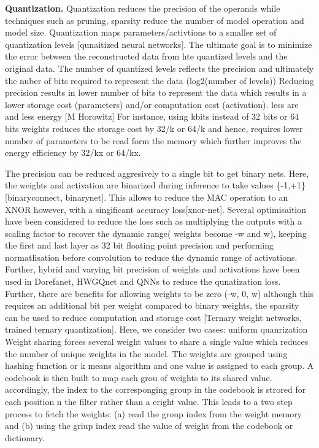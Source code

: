 \noindent\textbf{Quantization.} Quantization reduces the precision of the operands while techniques such as pruning, sparsity reduce the number of model operation and model size.
Quantization maps parameters/activtions to a smaller set of quantization levels [qunaitized neural networks].
The ultimate goal is to minimize the error between the reconstructed data from hte quantized levels and the original data.
The number of quantized levels reflects the precision and ultimately the nuber of bits required to represent the data (log2(number of levels))
Reducing precision results in lower number of bits to represent the data which results in a lower storage cost (parameters) and/or computation cost (activation). less are and less energy [M Horowitz]
For instance, using kbits instead of 32 bits or 64 bits weights reduces the storage cost by 32/k or 64/k and hence, requires lower number of parameters to be read form the memory which further improves the energy efficiency by 32/kx or 64/kx.

The precision can be reduced aggresively to a single bit to get binary nets. Here, the weights  and activation are binarized during inference to take values \{-1,+1\} [binaryconnect, binarynet]. This allows to reduce the MAC operation to an XNOR however, with a singificant accuracy loss[xnor-net].
Several optimisaition have been considered to reduce the loss such as multiplying the outputs with a scaling factor to recover the dynamic range( weights become -w and w), keeping the first and last layer as 32 bit floating point precision and performing normatlisation before convolution to reduce the dynamic range of activations.
Further, hybrid and varying bit precision of weights and activations have been used in Dorefanet, HWGQnet and QNNs to reduce the qunatization loss.
Further, there are benefits for allowing weights to be zero (-w, 0, w) although this requires an additional bit per weight compared to binary weights, the sparsity can be used to reduce computation and storage cost [Ternary weight networks, trained ternary quantization].
Here, we consider two cases: uniform quanrization
Weight sharing forces several weight values to share a single value which reduces the number of unique weights in the model.
The weights are grouped using hashing function or k means algorithm and one value is assigned to each group.
A codebook is then built to map each grou of weights to its shared value. accordingly, the index to the corresponging group in the codebook is strored for each position n the filter rather than a eright value. This leads to a two step process to fetch the weights:
(a) read the group index from the weight memory and (b) using the griup index read the value of weight from the codebook or dictionary.

